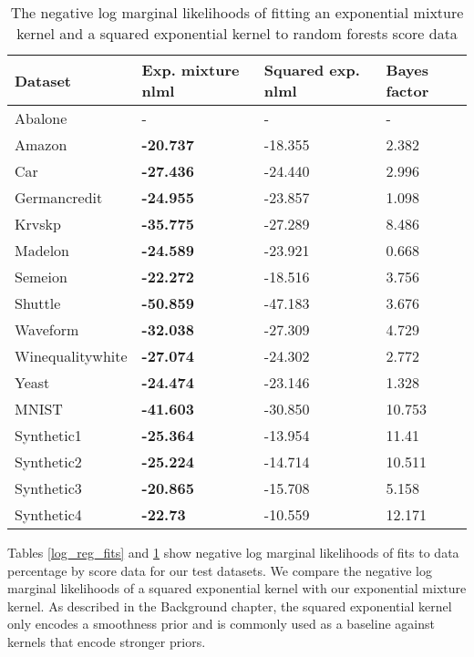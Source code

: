 \documentclass[a4paper,12pt,twoside,openright]{report}
\begin{document}
\begin{table}
\centering
\begin{tabular}{|l|l|l|l|}
\hline
Dataset          & Exp. mixture nlml & Squared exp. nlml & Bayes factor \\ \hline\hline
Abalone          & -                 & -       & -              \\ \hline
Amazon           & \textbf{-20.737}  & -18.355 & 2.382          \\ \hline
Car              & \textbf{-27.436}  & -24.440 & 2.996          \\ \hline
Germancredit     & \textbf{-24.955}  & -23.857 & 1.098          \\ \hline
Krvskp           & \textbf{-35.775}  & -27.289 & 8.486          \\ \hline
Madelon          & \textbf{-24.589}  & -23.921 & 0.668          \\ \hline
Semeion          & \textbf{-22.272}  & -18.516 & 3.756          \\ \hline
Shuttle          & \textbf{-50.859}  & -47.183 & 3.676          \\ \hline
Waveform         & \textbf{-32.038}  & -27.309 & 4.729          \\ \hline
Winequalitywhite & \textbf{-27.074}  & -24.302 & 2.772          \\ \hline
Yeast            & \textbf{-24.474}  & -23.146 & 1.328          \\ \hline\hline
MNIST            & \textbf{-41.603}  & -30.850 & 10.753         \\ \hline
Synthetic1       & \textbf{-25.364}  & -13.954 & 11.41          \\ \hline
Synthetic2       & \textbf{-25.224}  & -14.714 & 10.511         \\ \hline
Synthetic3       & \textbf{-20.865}  & -15.708 & 5.158          \\ \hline
Synthetic4       & \textbf{-22.73}   & -10.559 & 12.171         \\ \hline
\end{tabular}
	\caption{The negative log marginal likelihoods of fitting an exponential mixture kernel and a squared exponential kernel to random forests score data}
\label{rnd_forest_fits}
\end{table}

Tables \ref{log_reg_fits} and \ref{rnd_forest_fits} show negative log marginal likelihoods  of fits to data percentage by score data for our test datasets. We compare the negative log marginal likelihoods of a squared exponential kernel with our exponential mixture kernel. As described in the Background chapter, the squared exponential kernel only encodes a smoothness prior and is commonly used as a baseline against kernels that encode stronger priors.
\end{document}
